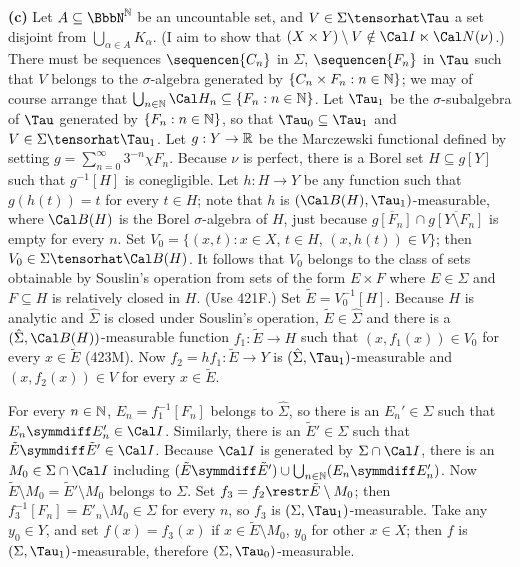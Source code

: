 {{\bf (c)} Let $A\subseteq\NN$ be an uncountable set, and
$V\in\Sigma\tensorhat\Tau$ a set disjoint from
$\bigcup_{\alpha\in A}K_{\alpha}$.  (I aim to show that
$(X\times Y)\setminus V\notin\Cal I\ltimes\Cal N(\nu)$.)   There must be
sequences $\sequencen{C_n}$ in $\Sigma$, $\sequencen{F_n}$ in $\Tau$
such that $V$ belongs to the $\sigma$-algebra
generated by $\{C_n\times F_n:n\in\Bbb N\}$;  we may of course arrange
that $\bigcup_{n\in\Bbb N}\Cal H_n\subseteq\{F_n:n\in\Bbb N\}$.   Let
$\Tau_1$ be the
$\sigma$-subalgebra of $\Tau$ generated by $\{F_n:n\in\Bbb N\}$, so that
$\Tau_0\subseteq\Tau_1$ and $V\in\Sigma\tensorhat\Tau_1$.
Let $g:Y\to\Bbb R$ be the Marczewski functional defined by setting
$g=\sum_{n=0}^{\infty}3^{-n}\chi F_n$.
Because $\nu$ is perfect, there is a Borel set $H\subseteq g[Y]$ such
that $g^{-1}[H]$ is conegligible.   Let $h:H\to Y$ be any function such
that $g(h(t))=t$ for every
$t\in H$;  note that $h$ is $(\Cal B(H),\Tau_1)$-measurable, where $\Cal B(H)$
is the Borel $\sigma$-algebra of $H$, just because
$\overline{g[F_n]}\cap\overline{g[Y\setminus F_n]}$
is empty for every $n$.   Set $V_0=\{(x,t):x\in X$, $t\in H$,
$(x,h(t))\in V\}$;  then $V_0\in\Sigma\tensorhat\Cal B(H)$.
It follows that $V_0$ belongs to the class of sets obtainable by
Souslin's operation from sets of the form $E\times F$ where $E\in\Sigma$
and $F\subseteq H$ is relatively closed in $H$.
(Use 421F.)   Set $\tilde E=V_0^{-1}[H]$.   Because
$H$ is analytic and $\hat\Sigma$ is closed under Souslin's operation,
$\tilde E\in\hat\Sigma$ and there is a
$(\hat\Sigma,\Cal B(H))$-measurable function $f_1:\tilde E\to H$ such
that $(x,f_1(x))\in V_0$ for every $x\in \tilde E$ (423M).   Now
$f_2=hf_1:\tilde E\to Y$ is $(\hat\Sigma,\Tau_1)$-measurable and
$(x,f_2(x))\in V$ for every $x\in \tilde E$.

For every $n\in\Bbb N$, $E_n=f_1^{-1}[F_n]$ belongs to $\hat\Sigma$, so
there is an $E_n'\in\Sigma$ such that $E_n\symmdiff E'_n\in\Cal I$.
Similarly, there is an $\tilde E'\in\Sigma$
such that $\tilde E\symmdiff\tilde E'\in\Cal I$.   Because $\Cal I$ is
generated by $\Sigma\cap\Cal I$, there is an $M_0\in\Sigma\cap\Cal I$ including
$(\tilde E\symmdiff\tilde E')\cup\bigcup_{n\in\Bbb N}(E_n\symmdiff E'_n)$.
Now $\tilde E\setminus M_0=\tilde E'\setminus M_0$
belongs to $\Sigma$.   Set $f_3=f_2\restr\tilde E\setminus M_0$;  then
$f_3^{-1}[F_n]=E'_n\setminus M_0\in\Sigma$ for every $n$, so $f_3$ is
$(\Sigma,\Tau_1)$-measurable.   Take any
$y_0\in Y$, and set $f(x)=f_3(x)$ if $x\in\tilde E\setminus M_0$, $y_0$
for other $x\in X$;  then $f$ is $(\Sigma,\Tau_1)$-measurable, therefore
$(\Sigma,\Tau_0)$-measurable.

}
